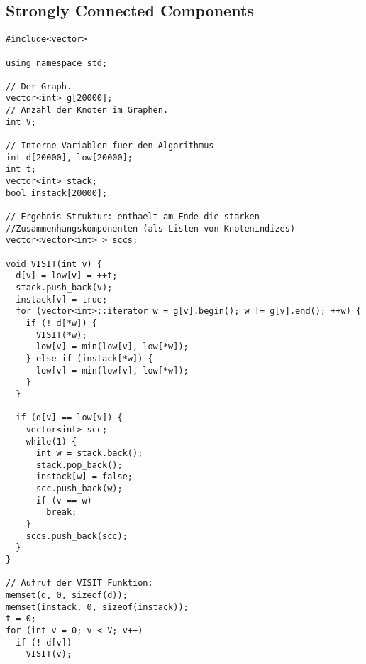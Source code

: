 \subsection{Strongly Connected Components}
\begin{lstlisting}
#include<vector>
 
using namespace std;
 
// Der Graph.
vector<int> g[20000];
// Anzahl der Knoten im Graphen.
int V;
 
// Interne Variablen fuer den Algorithmus
int d[20000], low[20000];
int t;
vector<int> stack;
bool instack[20000];
 
// Ergebnis-Struktur: enthaelt am Ende die starken 
//Zusammenhangskomponenten (als Listen von Knotenindizes)
vector<vector<int> > sccs;
 
void VISIT(int v) {
  d[v] = low[v] = ++t;
  stack.push_back(v);
  instack[v] = true;
  for (vector<int>::iterator w = g[v].begin(); w != g[v].end(); ++w) {
    if (! d[*w]) {
      VISIT(*w);
      low[v] = min(low[v], low[*w]);
    } else if (instack[*w]) {
      low[v] = min(low[v], low[*w]);
    }
  }
 
  if (d[v] == low[v]) {
    vector<int> scc;
    while(1) {
      int w = stack.back();
      stack.pop_back();
      instack[w] = false;
      scc.push_back(w);
      if (v == w)
        break;
    }
    sccs.push_back(scc);
  }
}
 
// Aufruf der VISIT Funktion:
memset(d, 0, sizeof(d));
memset(instack, 0, sizeof(instack));
t = 0;
for (int v = 0; v < V; v++)
  if (! d[v])
    VISIT(v);
\end{lstlisting}